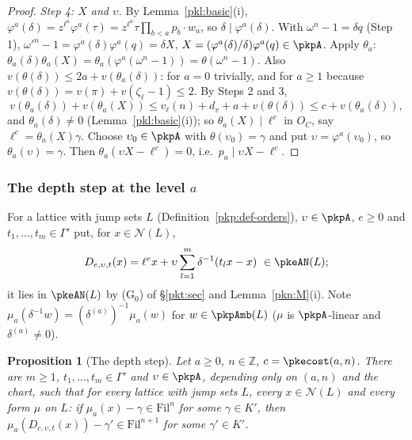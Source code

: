 \documentclass[10pt]{amsart}
\newtheorem{proposition}[theorem]{Proposition}
\theoremstyle{definition}
\theoremstyle{remark}
\newcommand{\Z}{\mathbb Z}
\begin{document}
\begin{proof}
\emph{Step 4: $X$ and $\upsilon$.} By Lemma~\ref{pkl:basic}(i), $\varphi^a(\delta)=z^{\ell^a}\varphi^a(\tau)=
z^{\ell^a}\tau\prod_{b<a}p_b\cdot w_a$, so $\delta\mid\varphi^a(\delta)$. With $\omega^n-1=\delta q$ (Step 1),
$\omega'^n-1=\varphi^a(\delta)\varphi^a(q)=\delta X$, $X=(\varphi^a(\delta)/\delta)\varphi^a(q)\in\pkpA$. Apply
$\theta_a$: $\theta_a(\delta)\theta_a(X)=\theta_a(\varphi^a(\omega^n-1))=\theta(\omega^n-1)$. Also $v(\theta(\delta))
\le2a+v(\theta_a(\delta))$: for $a=0$ trivially, and for $a\ge1$ because $v(\theta(\delta))=v(\pi)+v(\zeta_\ell-1)
\le2$. By Steps 2 and 3,
\[
v(\theta_a(\delta))+v(\theta_a(X))\le v_\ell(n)+d_v+a+v(\theta(\delta))\le c+v(\theta_a(\delta)),
\]
and $\theta_a(\delta)\ne0$ (Lemma~\ref{pkl:basic}(i)); so $\theta_a(X)\mid\ell^c$ in $O_C$, say
$\ell^c=\theta_a(X)\gamma$. Choose $\upsilon_0\in\pkpA$ with $\theta(\upsilon_0)=\gamma$ and put $\upsilon=
\varphi^a(\upsilon_0)$, so $\theta_a(\upsilon)=\gamma$. Then $\theta_a(\upsilon X-\ell^c)=0$, i.e.\ $p_a\mid\upsilon X-
\ell^c$.
\end{proof}

\subsubsection{The depth step at the level $a$}\label{pke:ss-step}

For a lattice with jump sets $L$ (Definition~\ref{pkp:def-orders}), $\upsilon\in\pkpA$, $e\ge0$ and $t_1,\dots,t_m\in\Gamma'$ put, for $x\in\mathcal N(L)$,
\[
D_{e,\upsilon,t}(x)=\ell^ex+\upsilon\sum_{l=1}^m\delta^{-1}(t_lx-x)\ \in\pkeAN(L);
\]
it lies in $\pkeAN(L)$ by (G$_0$) of \S\ref{pkt:sec} and Lemma~\ref{pkn:M}(i). Note
$\mu_a(\delta^{-1}w)=(\delta^{(a)})^{-1}\mu_a(w)$ for $w\in\pkpAmb(L)$ ($\mu$ is $\pkpA$-linear and
$\delta^{(a)}\ne0$).

\begin{proposition}[The depth step]\label{pke:step}
Let $a\ge0$, $n\in\Z$, $c=\pkecost(a,n)$. There are $m\ge1$, $t_1,\dots,t_m\in\Gamma'$ and $\upsilon\in\pkpA$,
depending only on $(a,n)$ and the chart, such that for every lattice with jump sets $L$, every $x\in\mathcal N(L)$ and every
form $\mu$ on $L$: if $\mu_a(x)-\gamma\in\mathrm{Fil}^n$ for some $\gamma\in K'$, then
$\mu_a(D_{c,\upsilon,t}(x))-\gamma'\in\mathrm{Fil}^{n+1}$ for some $\gamma'\in K'$.
\end{proposition}
\end{document}
